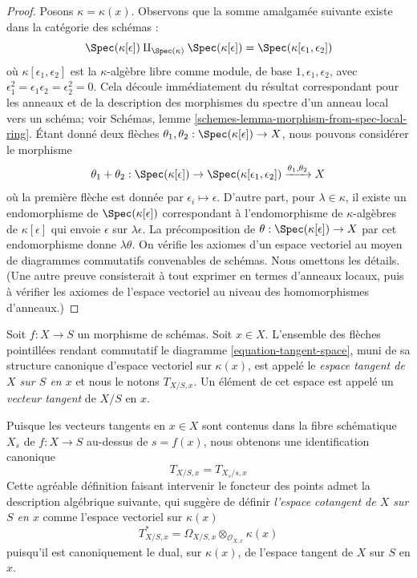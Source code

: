 \begin{proof}
Posons $\kappa = \kappa(x)$. Observons que la somme
amalgamée suivante existe dans la catégorie des schémas :
$$
\Spec(\kappa[\epsilon]) \amalg_{\Spec(\kappa)} \Spec(\kappa[\epsilon])
= \Spec(\kappa[\epsilon_1, \epsilon_2])
$$
où $\kappa[\epsilon_1, \epsilon_2]$ est la $\kappa$-algèbre
libre comme module, de base $1, \epsilon_1, \epsilon_2$, avec
$\epsilon_1^2 = \epsilon_1\epsilon_2 =
\epsilon_2^2 = 0$. Cela découle immédiatement du
résultat correspondant pour les anneaux et de la
description des morphismes du spectre d'un anneau
local vers un schéma; voir Schémas, lemme
\ref{schemes-lemma-morphism-from-spec-local-ring}.
Étant donné deux flèches $\theta_1, \theta_2 :
\Spec(\kappa[\epsilon]) \to X$, nous pouvons considérer le morphisme
$$
\theta_1 + \theta_2 :
\Spec(\kappa[\epsilon]) \to
\Spec(\kappa[\epsilon_1, \epsilon_2])
\xrightarrow{\theta_1, \theta_2} X
$$
où la première flèche est donnée par $\epsilon_i \mapsto \epsilon$.
D'autre part, pour $\lambda \in \kappa$, il existe un endomorphisme de
$\Spec(\kappa[\epsilon])$ correspondant à l'endomorphisme
de $\kappa$-algèbres de $\kappa[\epsilon]$ qui envoie $\epsilon$ sur
$\lambda \epsilon$. La précomposition de $\theta : \Spec(\kappa[\epsilon]) \to X$ par
cet endomorphisme donne $\lambda \theta$. On vérifie
les axiomes d'un espace vectoriel au moyen de diagrammes
commutatifs convenables de schémas. Nous omettons les détails. (Une
autre preuve consisterait à tout exprimer en termes d'anneaux locaux, puis à
vérifier les axiomes de l'espace vectoriel au niveau des homomorphismes d'anneaux.)
\end{proof}

\begin{definition}
\label{definition-tangent-space}
Soit $f : X \to S$ un morphisme de schémas. Soit $x \in X$.
L'ensemble des flèches pointillées rendant commutatif le diagramme \ref{equation-tangent-space},
muni de sa structure canonique d'espace vectoriel sur $\kappa(x)$, est
appelé le {\it espace tangent de $X$ sur $S$ en $x$} et nous le notons $T_{X/S,
x}$. Un élément de cet espace est appelé un {\it vecteur tangent} de $X/S$ en $x$.
\end{definition}

\noindent
Puisque les vecteurs tangents en $x \in X$ sont contenus dans la fibre schématique $X_s$ de
$f : X \to S$ au-dessus de $s = f(x)$, nous obtenons une identification canonique
\begin{equation}
\label{equation-tangent-space-fibre}
T_{X/S, x} = T_{X_s/s, x}
\end{equation}
Cette agréable définition faisant intervenir le
foncteur des points admet la description algébrique
suivante, qui suggère de définir {\it l'espace cotangent de
$X$ sur $S$ en $x$} comme l'espace vectoriel sur $\kappa(x)$
$$
T^*_{X/S, x} = \Omega_{X/S, x} \otimes_{\mathcal{O}_{X, x}} \kappa(x)
$$
puisqu'il est canoniquement le dual, sur
$\kappa(x)$, de l'espace tangent de $X$ sur $S$ en $x$.

